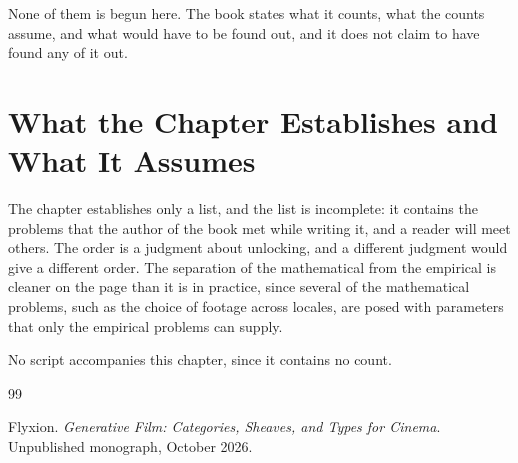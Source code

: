 \documentclass[11pt,twoside,openright]{book}
\theoremstyle{plain}
\theoremstyle{definition}
\theoremstyle{remark}
\begin{document}
None of them is begun here. The book states what it counts, what the counts assume, and what would have to be found out, and it does not claim to have found any of it out.

\section{What the Chapter Establishes and What It Assumes}\label{sec:limits18}

The chapter establishes only a list, and the list is incomplete: it contains the problems that the author of the book met while writing it, and a reader will meet others. The order is a judgment about unlocking, and a different judgment would give a different order. The separation of the mathematical from the empirical is cleaner on the page than it is in practice, since several of the mathematical problems, such as the choice of footage across locales, are posed with parameters that only the empirical problems can supply.

No script accompanies this chapter, since it contains no count.

\begin{thebibliography}{99}

Flyxion.
\newblock \emph{Generative Film: Categories, Sheaves, and Types for Cinema}.
\newblock Unpublished monograph, October 2026.

\end{thebibliography}
\end{document}
